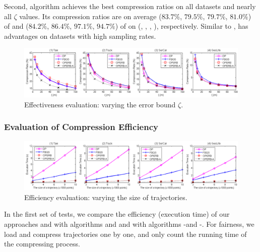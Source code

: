\ni Second, algorithm \operba achieves the best compression ratios on all datasets and nearly all $\zeta$ values.
Its compression ratios are on average ($83.7\%$, $79.5\%$, $79.7\%$, $81.0\%$) of \fbqsa and ($84.2\%$, $86.4\%$, $97.1\%$, $94.7\%$) of \dpa on (\taxi, \truck, \sercar, \geolife), respectively.
Similar to \operb, \operba has advantages on datasets with high sampling rates.


\begin{figure}[tb!]
\centering
\includegraphics[scale=0.465]{figures/exp-CompressionRatio.png}
\vspace{-2.5ex}
\caption{\small Effectiveness evaluation: varying the error bound $\zeta$.}
\label{fig:cr}
\vspace{-.5ex}
\end{figure}




\subsubsection{Evaluation of Compression Efficiency}

\begin{figure}[tb!]
\centering
\includegraphics[scale = 0.465]{figures/Exp-time-size.png}
\vspace{-2.5ex}
\caption{\small Efficiency evaluation: varying the size of trajectories.}\label{fig:time-size}
\vspace{-1ex}
\end{figure}


In the first set of tests, we compare the efficiency (execution time) of our approaches \operb and \operba with algorithms \dpa and \fbqsa
and with algorithms -\operb and -\operba.
For fairness, we load and compress trajectories one by one, and only count the running time of the compressing process.


